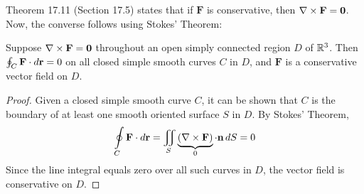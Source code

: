 \documentclass[mathNotesPreamble]{subfiles}
\begin{document}
  \noindent
  Theorem 17.11 (Section 17.5) states that if $\mathbf F$ is conservative, then $\nabla\times\mathbf F=\mathbf{0}$. Now, the converse follows using Stokes' Theorem:

  \begin{thmBox*}[Theorem 17.16: Curl $\mathbf F=\bfO$ implies $\mathbf F$ Is Conservative]
    Suppose $\nabla\times\mathbf F=\mathbf{0}$ throughout an open simply connected region $D$ of $\mathbb{R}^3$. Then $\oint_C\mathbf F\cdot d{\mathbf{r}}=0$ on all closed simple smooth curves $C$ in $D$, and $\mathbf F$ is a conservative vector field on $D$.
  \end{thmBox*}
  \begin{proof}
    Given a closed simple smooth curve $C$, it can be shown that $C$ is the boundary of at least one smooth oriented surface $S$ in $D$. By Stokes' Theorem,
      \[\oint\limits_C \mathbf F\cdot d{\mathbf{r}}=\iint\limits_S \underbrace{{\left(\nabla\times\mathbf F\right)}}_{0}\cdot{\mathbf{n}}\,dS=0\]
    Since the line integral equals zero over all such curves in $D$, the vector field is conservative on $D$.
  \end{proof}

  \pagebreak
  
\end{document}
